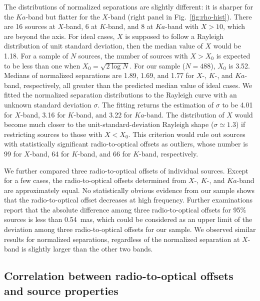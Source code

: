 \documentclass[referee]{aa}        %
\begin{document}
    The distributions of normalized separations are slightly different: it is sharper for the $Ka$-band but flatter for the $X$-band (right panel in Fig.~\ref{fig:rho-hist}).
    There are 16 sources at $X$-band, 6 at $K$-band, and 8 at $Ka$-band with $X>10$, which are beyond the axis.
    For ideal cases, $X$ is supposed to follow a Rayleigh distribution of unit standard deviation, then the median value of $X$ would be 1.18.
    For a sample of $N$ sources, the number of sources with $X>X_0$ is expected to be less than one when $X_0=\sqrt{2\log{N}}$.
    For our sample ($N=488$), $X_0$ is 3.52.
    Medians of normalized separations are 1.89, 1.69, and 1.77 for $X$-, $K$-, and $Ka$-band, respectively, all greater than the predicted median value of ideal cases.
    We fitted the normalized separation distributions to the Rayleigh curve with an unknown standard deviation $\sigma$.
    The fitting returns the estimation of $\sigma$ to be 4.01 for $X$-band, 3.16 for $K$-band, and 3.22 for $Ka$-band.
    The distribution of $X$ would become much closer to the unit-standard-deviation Rayleigh shape ($\sigma \simeq 1.3$) if restricting sources to those with $X<X_0$.
    This criterion would rule out sources with statistically significant radio-to-optical offsets as outliers, whose number is 99 for $X$-band, 64 for $K$-band, and 66 for $K$-band, respectively.

    We further compared three radio-to-optical offsets of individual sources. %
    Except for a few cases, the radio-to-optical offsets determined from $X$-, $K$-, and $Ka$-band are approximately equal.
    No statistically obvious evidence from our sample shows that the radio-to-optical offset decreases at high frequency.
    Further examinations report that the absolute difference among three radio-to-optical offsets for 95\% sources is less than 0.54~mas, which could be considered as an upper limit of the deviation among three radio-to-optical offsets for our sample.
    We observed similar results for normalized separations, regardless of the normalized separation at $X$-band is slightly larger than the other two bands.

\subsection{Correlation between radio-to-optical offsets and source properties}    \label{subsec:r2o-corr}
\end{document}
